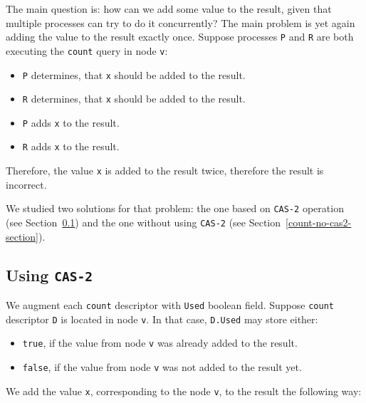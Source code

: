 \documentclass[times, dvipsnames,%
               languages={russian,english} %
              ]{itmo-student-thesis}
\begin{document}
\bigbreak

The main question is: how can we add some value to the result, given that multiple processes can try to do it concurrently? The main problem is yet again adding the value to the result exactly once. Suppose processes \texttt{P} and \texttt{R} are both executing the \texttt{count} query in node \texttt{v}:

\begin{itemize}
    \item \texttt{P} determines, that \texttt{x} should be added to the result.
    \item \texttt{R} determines, that \texttt{x} should be added to the result.
    \item \texttt{P} adds \texttt{x} to the result.
    \item \texttt{R} adds \texttt{x} to the result.
\end{itemize}

\bigbreak

Therefore, the value \texttt{x} is added to the result twice, therefore the result is incorrect.

We studied two solutions for that problem: the one based on \texttt{CAS-2} operation~\cite{cas-2-wiki} (see Section~\ref{count-cas2-section}) and the one without using \texttt{CAS-2} (see Section~\ref{count-no-cas2-section}).

\subsection{Using \texttt{CAS-2}}
\label{count-cas2-section}

We augment each \texttt{count} descriptor with \texttt{Used} boolean field. Suppose \texttt{count} descriptor \texttt{D} is located in node \texttt{v}. In that case, \texttt{D.Used} may store either:

\begin{itemize}
    \item \texttt{true}, if the value from node \texttt{v} was already added to the result.
    
    \item \texttt{false}, if the value from node \texttt{v} was not added to the result yet.
\end{itemize}

\bigbreak

We add the value \texttt{x}, corresponding to the node \texttt{v}, to the result the following way:
\end{document}
